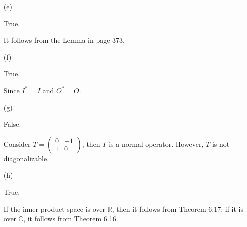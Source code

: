 \begin{Exercise}
\begin{enumerate}[(a)]
		\item[(e)]
		\begin{answer}
			True.
		\end{answer}
		\begin{solution}
			It follows from the Lemma in page 373.
		\end{solution}
		
		\item[(f)]
		\begin{answer}
			True.
		\end{answer}
		\begin{solution}
			Since $I^* = I$ and $O^* = O$.
		\end{solution}
		
		\item[(g)]
		\begin{answer}
			False.
		\end{answer}
		\begin{solution}
			Consider $T = \begin{pmatrix}
			0 & -1 \\
			1 & 0
			\end{pmatrix}$, then $T$ is a normal operator. However, $T$ is not diagonalizable.
		\end{solution}
		
		\item[(h)]
		\begin{answer}
			True.
		\end{answer}
		\begin{solution}
			If the inner product space is over $\mathbb{R}$, then it follows from Theorem 6.17; if it is over $\mathbb{C}$, it follows from Theorem 6.16.
		\end{solution}
		
	\end{enumerate}
\end{Exercise}